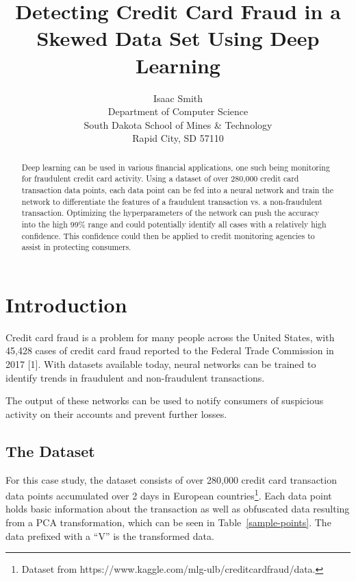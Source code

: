 \documentclass{article}
\title{Detecting Credit Card Fraud in a Skewed Data Set Using Deep Learning}
\author{
  Isaac Smith \\
  Department of Computer Science\\
  South Dakota School of Mines & Technology\\
  Rapid City, SD 57110 \\
}
\begin{document}

\maketitle

\begin{abstract}
 Deep learning can be used in various financial applications, one such being
 monitoring for fraudulent credit card activity. Using a dataset of over 280,000
 credit card transaction data points, each data point can be fed into a neural network
 and train the network to differentiate the features of a fraudulent transaction vs. 
a non-fraudulent transaction. Optimizing the hyperparameters of the network can
 push the accuracy into the high 99\% range and could potentially identify all
 cases with a relatively high confidence. This confidence could then be applied
 to credit monitoring agencies to assist in protecting consumers.
\end{abstract}

\section{Introduction}

 Credit card fraud is a problem for many people across the United States,
 with 45,428 cases of credit card fraud reported to the Federal Trade Commission in 2017 [1].
 With datasets available today, neural networks can be trained to identify trends
 in fraudulent and non-fraudulent transactions.

 The output of these networks can be used to notify consumers of
 suspicious activity on their accounts and prevent further losses.


\subsection{The Dataset}


For this case study, the dataset consists of over 280,000 credit card transaction 
data points accumulated over 2 days in European countries\footnote{Dataset from
 https://www.kaggle.com/mlg-ulb/creditcardfraud/data.}. Each data point 
holds basic information about the transaction as well as obfuscated data resulting 
from a PCA transformation, which can be seen in Table~\ref{sample-points}. The data 
prefixed with a “V” is the transformed data.
\end{document}

